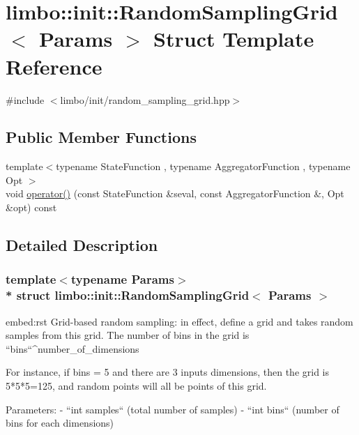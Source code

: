 \hypertarget{structlimbo_1_1init_1_1_random_sampling_grid}{}\section{limbo\+:\+:init\+:\+:Random\+Sampling\+Grid$<$ Params $>$ Struct Template Reference}
\label{structlimbo_1_1init_1_1_random_sampling_grid}


{\ttfamily \#include $<$limbo/init/random\+\_\+sampling\+\_\+grid.\+hpp$>$}

\subsection*{Public Member Functions}
\begin{DoxyCompactItemize}
\item 
{\footnotesize template$<$typename State\+Function , typename Aggregator\+Function , typename Opt $>$ }\\void \hyperlink{structlimbo_1_1init_1_1_random_sampling_grid_a6fd277031f69bf9da891b5f35065c369}{operator()} (const State\+Function \&seval, const Aggregator\+Function \&, Opt \&opt) const 
\end{DoxyCompactItemize}


\subsection{Detailed Description}
\subsubsection*{template$<$typename Params$>$\\*
struct limbo\+::init\+::\+Random\+Sampling\+Grid$<$ Params $>$}

\begin{DoxyVerb}embed:rst
Grid-based random sampling: in effect, define a grid and takes random samples from this grid. The number of bins in the grid is ``bins``^number_of_dimensions

For instance, if bins = 5 and there are 3 inputs dimensions, then the grid is 5*5*5=125, and random points will all be points of this grid.

Parameters:
  - ``int samples`` (total number of samples)
  - ``int bins`` (number of bins for each dimensions)
\end{DoxyVerb}
 

